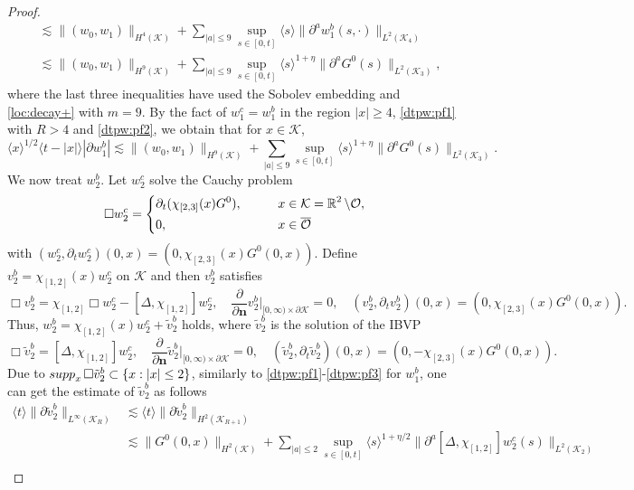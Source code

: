 \documentclass[10pt,a4paper]{amsart}
\def\R{\mathop{\mathbb R\kern 0pt}\nolimits}
\def\bn{\mathbf{n}}
\def\cK{\mathcal K}
\def\cO{\mathcal O}
\def\ls{\lesssim}
\def\p{\partial}
\def\supp{\mathop{\rm supp}\nolimits}
\newcommand{\w}[1]{\langle {#1} \rangle}
\begin{document}
\begin{proof}
\begin{equation}
\begin{split}
&\ls\|(w_0,w_1)\|_{H^4(\cK)}+\sum_{|a|\le9}\sup_{s\in[0,t]}\w{s}\|\p^aw_1^b(s,\cdot)\|_{L^2(\cK_4)}\\
&\ls\|(w_0,w_1)\|_{H^9(\cK)}+\sum_{|a|\le9}\sup_{s\in[0,t]}\w{s}^{1+\eta}\|\p^aG^0(s)\|_{L^2(\cK_3)},
\end{split}
\end{equation}
where the last three inequalities have used the Sobolev embedding and \eqref{loc:decay+} with $m=9$.
By the fact of $w_1^c=w_1^b$ in the region $|x|\ge4$, \eqref{dtpw:pf1} with $R>4$ and \eqref{dtpw:pf2},
we obtain that for $x\in\cK$,
\begin{equation}\label{dtpw:pf3}
\w{x}^{1/2}\w{t-|x|}|\p w_1^b|
\ls\|(w_0,w_1)\|_{H^9(\cK)}+\sum_{|a|\le9}\sup_{s\in[0,t]}\w{s}^{1+\eta}\|\p^aG^0(s)\|_{L^2(\cK_3)}.
\end{equation}
We now treat $w_2^b$.  Let $w_2^c$ solve the Cauchy problem
\begin{equation}\label{dtpw:pf4}
\Box w_2^c=\left\{
\begin{aligned}
&\p_t(\chi_{[2,3]}(x)G^0),\qquad&& x\in\cK=\R^2\setminus\cO,\\
&0,&& x\in\overline{\cO}
\end{aligned}
\right.
\end{equation}
with $(w_2^c, \p_tw_2^c)(0,x)=(0,\chi_{[2,3]}(x)G^0(0,x))$.
Define $v_2^b=\chi_{[1,2]}(x)w_2^c$ on $\cK$ and then $v_2^b$ satisfies
\begin{equation*}
\Box v_2^b=\chi_{[1,2]}\Box w_2^c-[\Delta,\chi_{[1,2]}]w_2^c,\quad \frac{\p}{\p\bn}v_2^b|_{[0,\infty)\times\p\cK}=0,\quad (v_2^b,\p_tv_2^b)(0,x)=(0,\chi_{[2,3]}(x)G^0(0,x)).
\end{equation*}
Thus, $w_2^b=\chi_{[1,2]}(x)w_2^c+\tilde v_2^b$ holds, where $\tilde v_2^b$ is the solution of the IBVP
\begin{equation*}
\Box\tilde v_2^b=[\Delta,\chi_{[1,2]}]w_2^c,
\quad\frac{\p}{\p\bn}\tilde v_2^b|_{[0,\infty)\times\p\cK}=0,\quad (\tilde v_2^b,\p_t\tilde v_2^b)(0,x)=(0,-\chi_{[2,3]}(x)G^0(0,x)).
\end{equation*}
Due to $\supp_x\Box\tilde v_2^b\subset\{x:|x|\le2\}$, similarly to \eqref{dtpw:pf1}-\eqref{dtpw:pf3} for $w_1^b$,
one can get the estimate of $\tilde v_2^b$ as follows
\begin{equation}\label{dtpw:pf5}
\begin{split}
\w{t}\|\p \tilde v_2^b\|_{L^\infty(\cK_R)}
&\ls\w{t}\|\p \tilde v_2^b\|_{H^2(\cK_{R+1})}\\
&\ls\|G^0(0,x)\|_{H^2(\cK)}+\sum_{|a|\le2}\sup_{s\in[0,t]}\w{s}^{1+\eta/2}\|\p^a[\Delta,\chi_{[1,2]}]w_2^c(s)\|_{L^2(\cK_2)}\\

\end{split}
\end{equation}
\end{proof}
\end{document}
